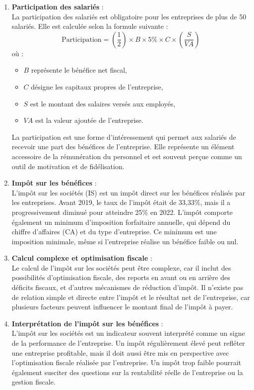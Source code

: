 \documentclass[a4paper, 12pt]{report}
\begin{document}
\begin{enumerate}
	\item \textbf{Participation des salariés} :\\
	La participation des salariés est obligatoire pour les entreprises de plus de 50 salariés. Elle est calculée selon la formule suivante : 
	\[
	\text{Participation} = \left( \frac{1}{2} \right) \times B \times 5\% \times C \times \left( \frac{S}{VA} \right)
	\]
	où :
	\begin{itemize}
		\item $B$ représente le bénéfice net fiscal,
		\item $C$ désigne les capitaux propres de l'entreprise,
		\item $S$ est le montant des salaires versés aux employés,
		\item $VA$ est la valeur ajoutée de l'entreprise.
	\end{itemize}
	La participation est une forme d'intéressement qui permet aux salariés de recevoir une part des bénéfices de l'entreprise. Elle représente un élément accessoire de la rémunération du personnel et est souvent perçue comme un outil de motivation et de fidélisation.
	
	\item \textbf{Impôt sur les bénéfices} :\\
	L'impôt sur les sociétés (IS) est un impôt direct sur les bénéfices réalisés par les entreprises. Avant 2019, le taux de l'impôt était de 33,33\%, mais il a progressivement diminué pour atteindre 25\% en 2022. L'impôt comporte également un minimum d'imposition forfaitaire annuelle, qui dépend du chiffre d'affaires (CA) et du type d'entreprise. Ce minimum est une imposition minimale, même si l'entreprise réalise un bénéfice faible ou nul.
	
	\item \textbf{Calcul complexe et optimisation fiscale} :\\
	Le calcul de l'impôt sur les sociétés peut être complexe, car il inclut des possibilités d'optimisation fiscale, des reports en avant ou en arrière des déficits fiscaux, et d'autres mécanismes de réduction d'impôt. Il n'existe pas de relation simple et directe entre l'impôt et le résultat net de l'entreprise, car plusieurs facteurs peuvent influencer le montant final de l'impôt à payer.
	
	\item \textbf{Interprétation de l'impôt sur les bénéfices} :\\
	L'impôt sur les sociétés est un indicateur souvent interprété comme un signe de la performance de l'entreprise. Un impôt régulièrement élevé peut refléter une entreprise profitable, mais il doit aussi être mis en perspective avec l'optimisation fiscale réalisée par l'entreprise. Un impôt trop faible pourrait également susciter des questions sur la rentabilité réelle de l'entreprise ou la gestion fiscale.
\end{enumerate}
\end{document}
